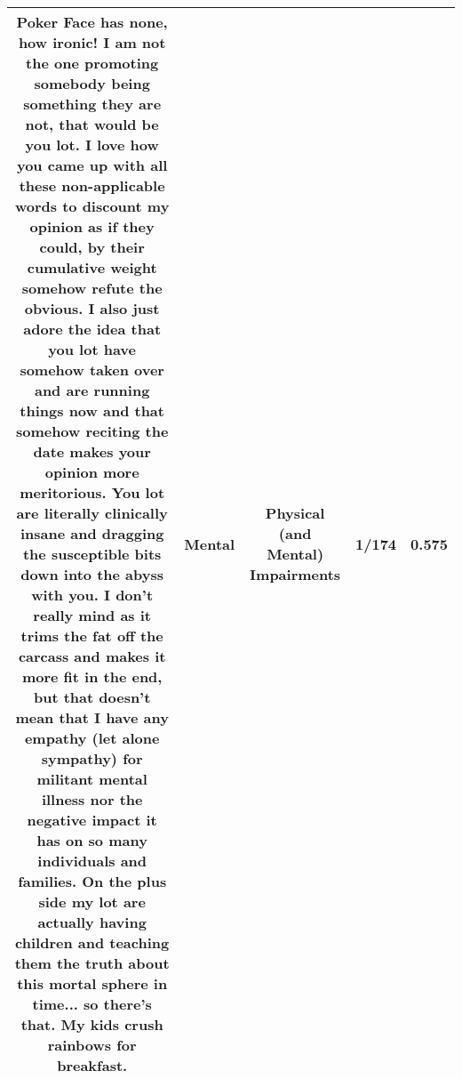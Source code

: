 \documentclass[11pt]{article}
\newlength\mylength
\begin{document}
\begin{center}
\begin{longtable}{|C{.40\mylength}|C{.30\mylength}|C{.15\mylength}|C{.15\mylength}|C{.15\mylength}|}
  Poker Face has none, how ironic! I am not the one promoting somebody being something they are not, that would be you lot.   I love how you came up with all these non-applicable words to discount my opinion as if they could, by their cumulative weight somehow refute the obvious. I also just adore the idea that you lot have somehow taken over and are running things now and that somehow reciting the date makes your opinion more meritorious.  You lot are literally clinically insane and dragging the susceptible bits down into the abyss with you. I don't really mind as it trims the fat off the carcass and makes it more fit in the end, but that doesn't mean that I have any empathy (let alone sympathy) for militant mental illness nor the negative impact it has on so many individuals and families.  On the plus side my lot are actually having children and teaching them the truth about this mortal sphere in time... so there's that. My kids crush rainbows for breakfast.  & Mental & Physical (and Mental) Impairments & 1/174 & 0.575 \\  \hline

\end{longtable}
\end{center}
\end{document}

